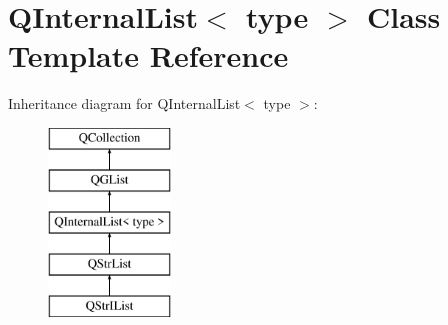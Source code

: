\hypertarget{class_q_internal_list}{}\section{Q\+Internal\+List$<$ type $>$ Class Template Reference}
\label{class_q_internal_list}
Inheritance diagram for Q\+Internal\+List$<$ type $>$\+:\begin{figure}[H]
\begin{center}
\leavevmode
\includegraphics[height=5.000000cm]{class_q_internal_list}
\end{center}
\end{figure}
